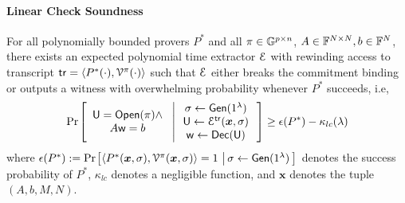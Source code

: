 \paragraph*{Linear Check Soundness}
\begin{lemma}[Soundness]\label{lem:linearcheck_sound}
	For all polynomially bounded provers $P^\ast$ and all $\pi\in \mathbb{G}^{p\times n}$, $A\in \mathbb{F}^{N\times N}, b\in \mathbb{F}^N$, there exists an expected polynomial time extractor $\mathcal{E}$ with rewinding access to transcript $\mathsf{tr}=\langle P^\ast(\cdot),\mathcal{V}^\pi(\cdot)\rangle$ such that $\mathcal{E}$ either breaks the commitment binding or outputs a witness with overwhelming probability whenever $P^\ast$ succeeds, i.e,
	{\small
		\begin{align*}
		\condprob{\begin{array}{c}
			\ewit=\open(\pi)\wedge \\
			A\wit=b
			\end{array}
		}{
			\begin{array}{c}
			\sigma\gets \gen(\secparam) \\
			\ewit\gets \extr^{\mathsf{tr}}(\bm{x},\sigma) \\
			\wit\gets \dec(\ewit)
			\end{array}}\geq
		\epsilon(P^\ast)-\kappa_{lc}(\secpar)
		\end{align*}
	}
	where $\epsilon(P^\ast):= \condprob{\langle P^\ast(\bm{x},\sigma),\verifier^\pi(\bm{x},\sigma)\rangle=1}{\sigma\gets \gen(\secparam)}$ denotes the success probability of $P^\ast$, $\kappa_{lc}$ denotes a negligible function, and $\bm{x}$ denotes the tuple $(A,b,M,N)$.
\end{lemma}
